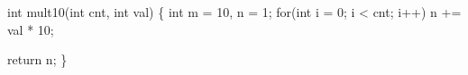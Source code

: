 \begin{minipage}{3in}
\begin{AVerb}[gobble=2,numbers=left]
  int mult10(int cnt, int val) \{ 
    int m = 10, n = 1; 
    for(int i = 0; i < cnt; i++)
      n += val * 10; \label{fig_back7_opt_loop}

    return n;
  \}
\end{AVerb}
\end{minipage}

